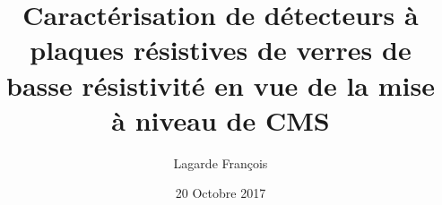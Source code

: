 \documentclass{beamer}
\title{Caractérisation de détecteurs à plaques résistives de verres de basse résistivité en vue de la mise à niveau de CMS}
\author{Lagarde François}
\date{20 Octobre 2017}
\institute{Institut de Physique Nucléaire de Lyon}
\begin{document}
	\begin{frame}
	\titlepage
	\end{frame}
\end{document}
